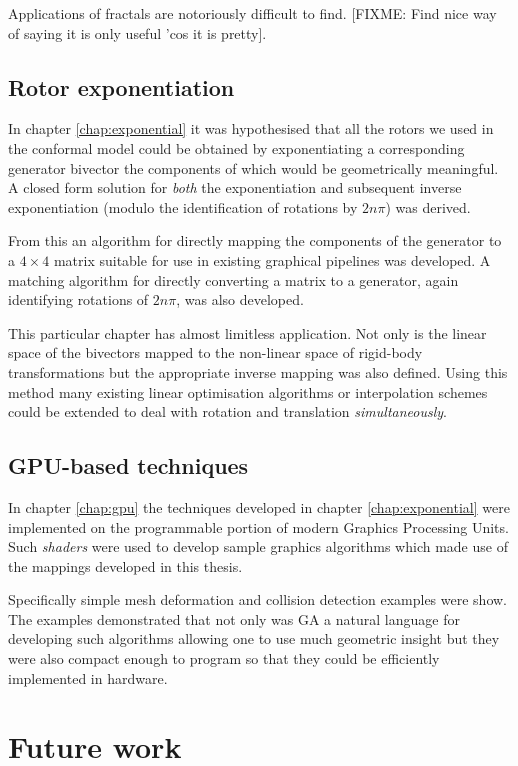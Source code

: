 Applications of fractals are notoriously difficult to find. [FIXME: Find nice way of
saying it is only useful 'cos it is pretty].

\subsection{Rotor exponentiation}

In chapter \ref{chap:exponential} it was hypothesised that all the rotors we
used in the conformal model could be obtained by exponentiating a corresponding
generator bivector the components of which would be geometrically meaningful.
A closed form solution for \emph{both} the exponentiation and subsequent
inverse exponentiation (modulo the identification of rotations by $2n\pi$) was
derived.

From this an algorithm for directly mapping the components of the generator
to a $4 \times 4$ matrix suitable for use in existing graphical pipelines
was developed. A matching algorithm for directly converting a matrix to
a generator, again identifying rotations of $2n\pi$, was also developed.

This particular chapter has almost limitless application. Not only is the
linear space of the bivectors mapped to the non-linear space of rigid-body
transformations but the appropriate inverse mapping was also defined. Using
this method many existing linear optimisation algorithms or interpolation
schemes could be extended to deal with rotation and translation
\emph{simultaneously}.

\subsection{GPU-based techniques}

In chapter \ref{chap:gpu} the techniques developed in chapter \ref{chap:exponential}
were implemented on the programmable portion of modern Graphics Processing
Units. Such \emph{shaders} were used to develop sample graphics algorithms which
made use of the mappings developed in this thesis. 

Specifically simple mesh deformation and collision detection examples were show.
The examples demonstrated that not only was GA a natural language for developing
such algorithms allowing one to use much geometric insight but they were also
compact enough to program so that they could be efficiently implemented in hardware.

\section{Future work}


